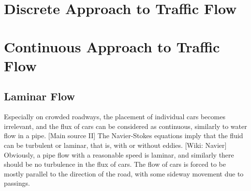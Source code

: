 \documentclass[12pt]{article}
\begin{document}
\newpage



































\section{Discrete Approach to Traffic Flow}

\section{Continuous Approach to Traffic Flow}

\subsection{Laminar Flow}












\newpage






Especially on crowded roadways, the placement of individual cars becomes irrelevant, and the flux of cars can be considered as continuous, similarly to water flow in a pipe. [Main source II] The Navier-Stokes equations imply that the fluid can be turbulent or laminar, that is, with or without eddies. [Wiki: Navier] Obviously,  a pipe flow with a reasonable speed is laminar, and similarly there should be no turbulence in the flux of cars. The flow of cars is forced to be mostly parallel to the direction of the road, with some sideway movement due to passings.\\

 
\end{document}

